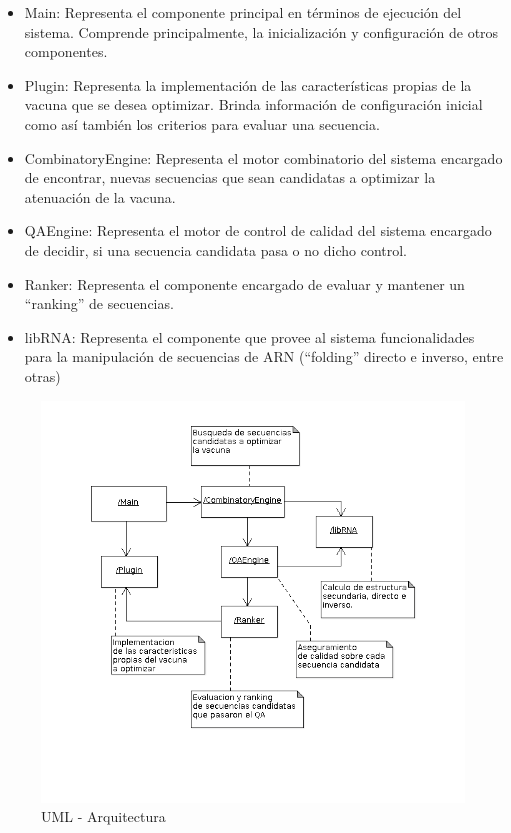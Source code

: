 \documentclass[a4paper,10pt]{article}
\begin{document}
  \begin{itemize}
   \item Main: Representa el componente principal en t\'erminos de ejecuci\'on
del sistema. Comprende principalmente, la inicializaci\'on y configuraci\'on de
otros componentes.

   \item Plugin: Representa la implementaci\'on de las caracter\'isticas propias
de la vacuna que se desea optimizar. Brinda informaci\'on de configuraci\'on
inicial como as\'i tambi\'en los criterios para evaluar una secuencia.

   \item CombinatoryEngine: Representa el motor combinatorio del sistema
encargado de encontrar, nuevas secuencias que sean candidatas a optimizar la
atenuaci\'on de la vacuna.

   \item QAEngine: Representa el motor de control de calidad del sistema
encargado de decidir, si una secuencia candidata pasa o no dicho control.

   \item Ranker: Representa el componente encargado de evaluar y mantener un
``ranking'' de secuencias.

   \item libRNA: Representa el componente que provee al sistema funcionalidades
para la manipulaci\'on de secuencias de ARN (``folding'' directo
e inverso, entre otras) 

  \end{itemize}

  \begin{figure}
  \centering
  \includegraphics[scale=0.5]{architecture.png}  
  \caption{UML - Arquitectura}
  \label{uml:architecture}
  \end{figure}
\end{document}
